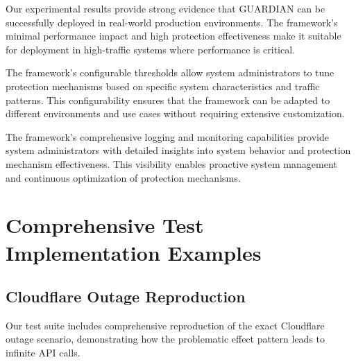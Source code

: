 \documentclass[10pt]{article}
\begin{document}
Our experimental results provide strong evidence that GUARDIAN can be successfully deployed in real-world production environments. The framework's minimal performance impact and high protection effectiveness make it suitable for deployment in high-traffic systems where performance is critical.

The framework's configurable thresholds allow system administrators to tune protection mechanisms based on specific system characteristics and traffic patterns. This configurability ensures that the framework can be adapted to different environments and use cases without requiring extensive customization.

The framework's comprehensive logging and monitoring capabilities provide system administrators with detailed insights into system behavior and protection mechanism effectiveness. This visibility enables proactive system management and continuous optimization of protection mechanisms.

\section{Comprehensive Test Implementation Examples}

\subsection{Cloudflare Outage Reproduction}

Our test suite includes comprehensive reproduction of the exact Cloudflare outage scenario, demonstrating how the problematic effect pattern leads to infinite API calls.
\end{document}
